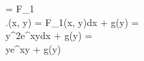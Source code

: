  = F_1 \implies {} \implies\\
\phi.(x, y) = \int F_1(x, y)dx + g(y) =\\
\int y^2e^{xy}dx + g(y) =\\
ye^{xy} + g(y)